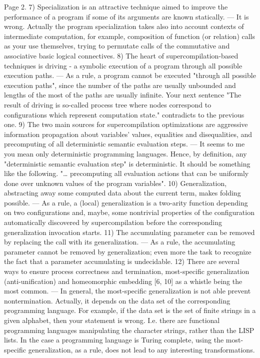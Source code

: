 Page 2.
7) Specialization is an attractive technique aimed to improve the performance of a program if some of its arguments are known statically.
 --- It is wrong. Actually the program specialization takes also into account contexts of intermediate computation, for example, composition of function (or relation) calls as your use themselves, trying to permutate calls of the commutative and associative basic logical connectives.
8) The heart of supercompilation-based techniques is driving - a symbolic execution of a program through all possible execution paths.
 --- As a rule, a program cannot be executed "through all possible execution paths", since the number of the paths are usually unbounded and lengths of the most of the paths are usually infinite. Your next sentence "The result of driving is so-called process tree where nodes correspond to configurations which represent computation state." contradicts to the previous one.
9) The two main sources for supercompilation optimizations are aggressive information propagation about variables' values, equalities and disequalities, and precomputing of all deterministic semantic evaluation steps.
 --- It seems to me you mean only deterministic programming languages. Hence, by definition, any "deterministic semantic evaluation step" is deterministic. It should be something like the following. "… precomputing all evaluation actions that can be uniformly done over unknown values of the program variables".
10) Generalization, abstracting away some computed data about the current term, makes folding possible.
 --- As a rule, a (local) generalization is a two-arity function depending on two configurations and, maybe, some nontrivial properties of the configuration automatically discovered by supercompilation before the corresponding generalization invocation starts.
11) The accumulating parameter can be removed by replacing the call with its generalization.
 --- As a rule, the accumulating parameter cannot be removed by generalization; even more the task to recognize the fact that a parameter accumulating is undecidable.
12) There are several ways to ensure process correctness and termination, most-specific generalization (anti-unification) and homeomorphic embedding [6, 10] as a whistle being the most common.
 --- In general, the most-specific generalization is not able prevent nontermination. Actually, it depends on the data set of the corresponding programming language. For example, if the data set is the set of finite strings in a given alphabet, then your statement is wrong. I.e. there are functional programming languages manipulating the character strings, rather than the LISP lists. In the case a programming language is Turing complete, using the most-specific generalization, as a rule, does not lead to any interesting transformations.
